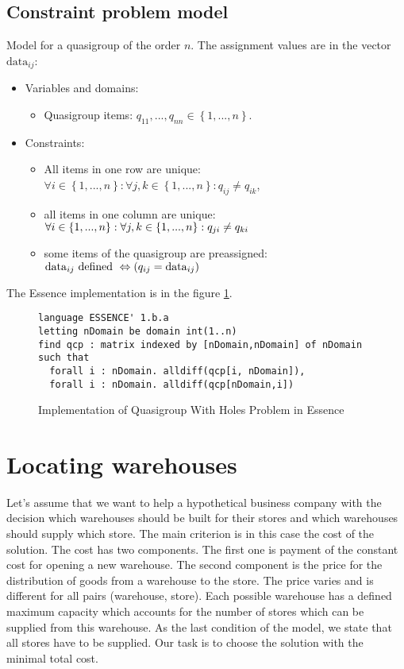 \subsection{Constraint problem model}
Model for a quasigroup of the order $n$. The assignment values are in the vector $\mathrm{data}_{ij}$:

\begin{itemize}
	\item Variables and domains: 
    \begin{itemize}
      \item Quasigroup items: $q_{11}, ..., q_{nn} \in \left\{1, ..., n\right\}$.
    \end{itemize}
	\item Constraints:
	 \begin{itemize}
    	\item All items in one row are unique: $\forall i \in \left\{1, ..., n\right\}: \forall j,k \in \left\{1, ..., n\right\}: q_{ij} \neq q_{ik}$, 
    	\item all items in one column are unique: $\forall i \in \left\{1, ..., n\right\}:\\ \forall j,k \in \left\{1, ..., n\right\}: q_{ji} \neq q_{ki}$ 
    	\item some items of the quasigroup are preassigned: $\mathrm{data}_{ij} \textnormal{ defined } \Leftrightarrow (q_{ij} = \mathrm{data}_{ij})$
	 \end{itemize}
\end{itemize}
The Essence implementation is in the figure \ref{benchmark-essence:qwh}.

\begin{figure}
\caption{\label{benchmark-essence:qwh}Implementation of Quasigroup With Holes Problem in Essence}
\begin{lstlisting}
language ESSENCE' 1.b.a
letting nDomain be domain int(1..n)
find qcp : matrix indexed by [nDomain,nDomain] of nDomain
such that
  forall i : nDomain. alldiff(qcp[i, nDomain]),
  forall i : nDomain. alldiff(qcp[nDomain,i])
\end{lstlisting} 
\end{figure}

\section{Locating warehouses}
Let's assume that we want to help a hypothetical business company with the decision which
warehouses should be built for their stores and which warehouses should supply which
store. The main criterion is in this case the cost of the solution. The cost has two components. The first one
is payment of the constant cost for opening a new warehouse. The second component is the price for the distribution of
goods from a warehouse to the store. The price varies and is different for all pairs (warehouse, store). 
Each possible warehouse has a defined maximum capacity which accounts for the number
of stores which can be supplied from this warehouse. As the last condition of the model, 
we state that all stores have to be supplied. Our task is to choose the solution with 
the minimal total cost.

